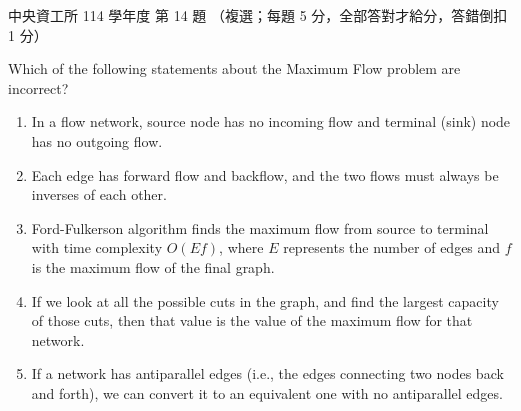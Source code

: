 \begin{pastexam}[label={px:ncu-114-dsa-14}]{中央資工所 114 學年度 第 14 題}
（複選；每題 5 分，全部答對才給分，答錯倒扣 1 分）

Which of the following statements about the Maximum Flow problem are incorrect?
\begin{enumerate}[label=(\alph*)]
\item In a flow network, source node has no incoming flow and terminal (sink) node has no outgoing flow.
\item Each edge has forward flow and backflow, and the two flows must always be inverses of each other.
\item Ford-Fulkerson algorithm finds the maximum flow from source to terminal with time complexity
$O(Ef)$, where $E$ represents the number of edges and $f$ is the maximum flow of the final graph.
\item If we look at all the possible cuts in the graph, and find the largest capacity of those cuts,
then that value is the value of the maximum flow for that network.
\item If a network has antiparallel edges (i.e., the edges connecting two nodes back and forth), we can
convert it to an equivalent one with no antiparallel edges.
\end{enumerate}
\end{pastexam}

